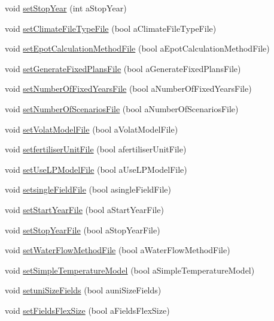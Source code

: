 \begin{DoxyCompactItemize}
void \hyperlink{classsystem_data_a603a6ff137421abe95aba9b553103235}{setStopYear} (int aStopYear)
\item 
void \hyperlink{classsystem_data_a898e34b6142c7aaf738b80db2a7556d3}{setClimateFileTypeFile} (bool aClimateFileTypeFile)
\item 
void \hyperlink{classsystem_data_a15b9e3568b9d58341b9c9ae1e536d555}{setEpotCalculationMethodFile} (bool aEpotCalculationMethodFile)
\item 
void \hyperlink{classsystem_data_a5edc4dc1a1d3e695410c647221647076}{setGenerateFixedPlansFile} (bool aGenerateFixedPlansFile)
\item 
void \hyperlink{classsystem_data_aed859671e3855b1a6f44d177a26f62ff}{setNumberOfFixedYearsFile} (bool aNumberOfFixedYearsFile)
\item 
void \hyperlink{classsystem_data_ac5f549e017b249ee28cc205dd447927f}{setNumberOfScenariosFile} (bool aNumberOfScenariosFile)
\item 
void \hyperlink{classsystem_data_a24227d9d1a95638fdc1033d564f7ced6}{setVolatModelFile} (bool aVolatModelFile)
\item 
void \hyperlink{classsystem_data_a1ae32115c7a6a82767642d0ef891ed7d}{setfertiliserUnitFile} (bool afertiliserUnitFile)
\item 
void \hyperlink{classsystem_data_aa2b9489e4dc0796ac0edb2abdcc99bed}{setUseLPModelFile} (bool aUseLPModelFile)
\item 
void \hyperlink{classsystem_data_a97e7e9ac45009f3d1afcd103c70a15ab}{setsingleFieldFile} (bool asingleFieldFile)
\item 
void \hyperlink{classsystem_data_a9fc437c9ce5650ec41a06d08cad09b91}{setStartYearFile} (bool aStartYearFile)
\item 
void \hyperlink{classsystem_data_a2428cc009cdc3ff84b3e0282fa11e5d9}{setStopYearFile} (bool aStopYearFile)
\item 
void \hyperlink{classsystem_data_a3426eaf406fa4f132ff4e7ba1a8296c6}{setWaterFlowMethodFile} (bool aWaterFlowMethodFile)
\item 
void \hyperlink{classsystem_data_ac75d94ecb9eea357540fdfc921cdfe6b}{setSimpleTemperatureModel} (bool aSimpleTemperatureModel)
\item 
void \hyperlink{classsystem_data_ae26b38e7c80e00428d7af0802588a9d6}{setuniSizeFields} (bool auniSizeFields)
\item 
void \hyperlink{classsystem_data_ae00a223b6f9014fa7ead9cbb5b9c98cb}{setFieldsFlexSize} (bool aFieldsFlexSize)
\item 

\end{DoxyCompactItemize}
